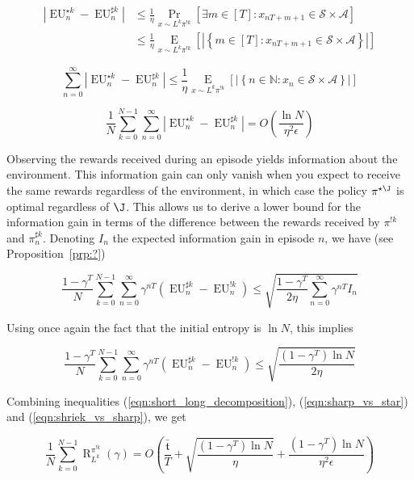 \documentclass[anon,12pt]{colt2018} %
\newcommand{\AP}[1]{\left(#1\right)}
\newcommand{\AB}[1]{\left[#1\right]}
\newcommand{\AC}[1]{\left\{#1\right\}}
\newcommand{\Pa}[2]{\underset{#1}{\operatorname{Pr}}\AB{#2}}
\newcommand{\Ea}[2]{\underset{#1}{\operatorname{E}}\AB{#2}}
\newcommand{\Nats}{\mathbb{N}}
\newcommand{\Abs}[1]{\left\vert #1 \right\vert}
\newcommand{\A}{\mathcal{A}}
\newcommand{\St}{\mathcal{S}}
\newcommand{\EU}{\operatorname{EU}}
\newcommand{\Rg}{\operatorname{R}}
\newcommand{\Tn}{\mathfrak{t}}
\newcommand{\IP}{\pi^{!k}}
\begin{document}
\begin{align*}
\Abs{\EU^{\star k}_n-\EU^{\sharp k}_n} &\leq \frac{1}{\eta}\Pa{x\sim L^k\pi^{!k}}{\exists m \in [T]: x_{nT+m+1}\in\St \times \A} \\ 
&\leq \frac{1}{\eta}\Ea{x\sim L^k\pi^{!k}}{\Abs{\AC{m \in [T]: x_{nT+m+1}\in\St \times \A}}}
\end{align*}

\[\sum_{n=0}^\infty {\Abs{\EU^{\star k}_n-\EU^{\sharp k}_n}} \leq \frac{1}{\eta}\Ea{x\sim L^k\pi^{!k}}{\Abs{\AC{n \in \Nats: x_n\in\St \times \A}}}\]

\begin{equation}
\label{eqn:sharp_vs_star}
\frac{1}{N}\sum_{k=0}^{N-1}\sum_{n=0}^\infty {\Abs{\EU^{\star k}_n-\EU^{\sharp k}_n}} = O\AP{\frac{\ln{N}}{\eta^2\epsilon}}
\end{equation}

Observing the rewards received during an episode yields information about the environment. This information gain can only vanish when you expect to receive the same rewards regardless of the environment, in which case the policy $\pi^{\star\J}$ is optimal regardless of $\J$. This allows us to derive a lower bound for the information gain in terms of the difference between the rewards received by $\pi^{!k}$ and $\pi^{\sharp k}_n$. Denoting $I_n$ the expected information gain in episode $n$, we have (see Proposition~\ref{prp:?})

\begin{equation}
\frac{1-\gamma^T}{N}\sum_{k=0}^{N-1}\sum_{n=0}^\infty \gamma^{nT}\AP{\EU^{\sharp k}_n-\EU^{!k}_n} \leq \sqrt{\frac{1-\gamma^T}{2\eta}\sum_{n=0}^\infty \gamma^{nT}I_n}
\end{equation}

Using once again the fact that the initial entropy is $\ln{N}$, this implies

\begin{equation}
\label{eqn:shriek_vs_sharp}
\frac{1-\gamma^T}{N}\sum_{k=0}^{N-1}\sum_{n=0}^\infty \gamma^{nT}\AP{\EU^{\sharp k}_n-\EU^{!k}_n} \leq \sqrt{\frac{\AP{1-\gamma^T}\ln{N}}{2\eta}}
\end{equation}

Combining inequalities (\ref{eqn:short_long_decomposition}), (\ref{eqn:sharp_vs_star}) and (\ref{eqn:shriek_vs_sharp}), we get

\begin{equation}
\frac{1}{N}\sum_{k=0}^{N-1}\Rg_{L^k}^{\IP}(\gamma) = O\AP{\frac{\bar{\Tn}}{T}+\sqrt{\frac{\AP{1-\gamma^T}\ln{N}}{\eta}}+\frac{\AP{1-\gamma^T}\ln{N}}{\eta^2\epsilon}}
\end{equation}
\end{document}
